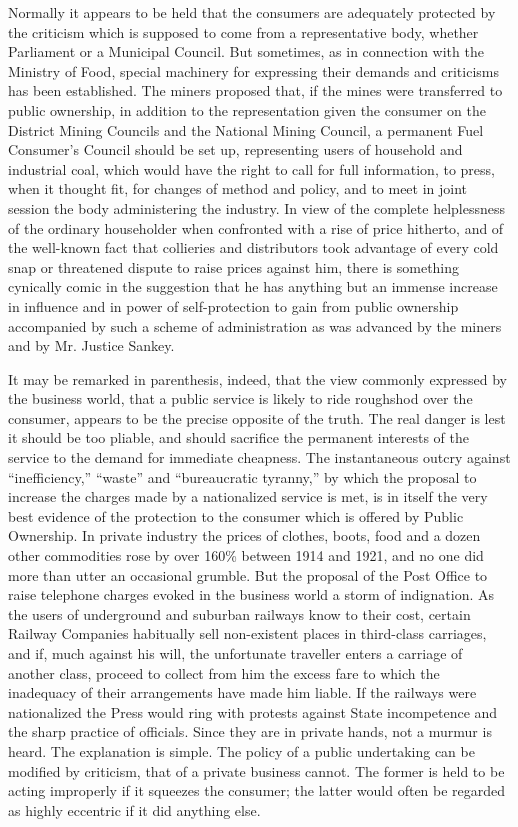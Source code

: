 \documentclass{book}
\begin{document}
Normally it appears to be held that the consumers are adequately protected by the criticism which is supposed to come from a representative body, whether Parliament or a Municipal Council. But sometimes, as in connection with the Ministry of Food, special machinery for expressing their demands and criticisms has been established. The miners proposed that, if the mines were transferred to public ownership, in addition to the representation given the consumer on the District Mining Councils and the National Mining Council, a permanent Fuel Consumer’s Council should be set up, representing users of household and industrial coal, which would have the right to call for full information, to press, when it thought fit, for changes of method and policy, and to meet in joint session the body administering the industry. In view of the complete helplessness of the ordinary householder when confronted with a rise of price hitherto, and of the well-known fact that collieries and distributors took advantage of every cold snap or threatened dispute to raise prices against him, there is something cynically comic in the suggestion that he has anything but an immense increase in influence and in power of self-protection to gain from public ownership accompanied by such a scheme of administration as was advanced by the miners and by Mr. Justice Sankey.

It may be remarked in parenthesis, indeed, that the view commonly expressed by the business world, that a public service is likely to ride roughshod over the consumer, appears to be the precise opposite of the truth. The real danger is lest it should be too pliable, and should sacrifice the permanent interests of the service to the demand for immediate cheapness. The instantaneous outcry against “inefficiency,” “waste” and “bureaucratic tyranny,” by which the proposal to increase the charges made by a nationalized service is met, is in itself the very best evidence of the protection to the consumer which is offered by Public Ownership. In private industry the prices of clothes, boots, food and a dozen other commodities rose by over 160\% between 1914 and 1921, and no one did more than utter an occasional grumble. But the proposal of the Post Office to raise telephone charges evoked in the business world a storm of indignation. As the users of underground and suburban railways know to their cost, certain Railway Companies habitually sell non-existent places in third-class carriages, and if, much against his will, the unfortunate traveller enters a carriage of another class, proceed to collect from him the excess fare to which the inadequacy of their arrangements have made him liable. If the railways were nationalized the Press would ring with protests against State incompetence and the sharp practice of officials. Since they are in private hands, not a murmur is heard. The explanation is simple. The policy of a public undertaking can be modified by criticism, that of a private business cannot. The former is held to be acting improperly if it squeezes the consumer; the latter would often be regarded as highly eccentric if it did anything else.
\end{document}
